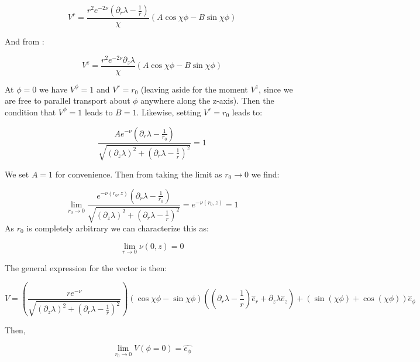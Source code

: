 \documentclass{article}
\begin{document}
\begin{equation}
V^{r}=\frac{r^2e^{-2\nu}(\partial_r\lambda-\frac{1}{r})}{\chi}\left(A\cos\chi\phi-B\sin\chi\phi\right)
\end{equation}

And from :

\begin{equation}
V^{z}=\frac{r^2 e^{-2\nu}\partial_z\lambda}{\chi}\left(A\cos\chi\phi-B\sin\chi\phi\right)
\end{equation}

At $\phi=0$ we have $V^\phi=1$ and $V^r=r_0$ (leaving aside for the
moment $V^z$, since we are free to parallel transport about $\phi$
anywhere along the z-axis). Then the condition that $V^\phi=1$ leads to
$B=1$. Likewise, setting $V^r=r_0$ leads to:

\begin{equation}
  \label{eq:conditions}
  \frac{A e^{-\nu}(\partial_r\lambda-\frac{1}{r_0})}{\sqrt{\left(\partial_z\lambda\right)^2+\left(\partial_r\lambda-\frac{1}{r}\right)^2}}=1
\end{equation}

We set $A=1$ for convenience. Then from  taking
the limit as $r_0\rightarrow 0$ we find:

\begin{equation}
  \label{eq:limit-r->0}
  \lim_{r_0\rightarrow 0} \frac{e^{-\nu(r_0,z)}(\partial_r\lambda-\frac{1}{r_0})}{\sqrt{\left(\partial_z\lambda\right)^2+\left(\partial_r\lambda-\frac{1}{r}\right)^2}}=e^{-\nu(r_0,z)}=1
\end{equation}
As $r_0$ is completely arbitrary we can characterize this as:

\begin{equation}
  \label{eq:nu-elem-flat}
  \lim_{r\rightarrow 0}\nu(0,z)=0
\end{equation}

The general expression for the vector is then:

\begin{equation}
\label{eq:v-from-par-transport}
V=\left(\frac{r e^{-\nu}}{\sqrt{\left(\partial_z\lambda\right)^2+\left(\partial_r\lambda-\frac{1}{r}\right)^2}}\right)\left(\cos\chi\phi-\sin\chi\phi\right)\left(\left(\partial_r\lambda-\frac{1}{r}\right)\hat{e}_{r}+\partial_z\lambda\hat{e}_{z}\right)+\left(\sin(\chi\phi)+\cos(\chi\phi)\right)\hat{e}_{\phi}
\end{equation}

Then,

\begin{equation}
  \label{eq:lim-0}
  \lim_{{r_0}\rightarrow 0} V\left(\phi=0\right)=\hat{e_{\phi}}
\end{equation}
\end{document}
